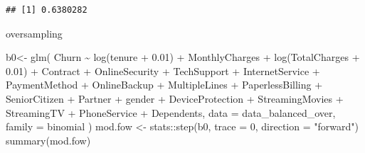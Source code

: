 \documentclass[
  twoside]{article}
\newenvironment{Shaded}{\begin{snugshade}}{\end{snugshade}}
\newcommand{\AttributeTok}[1]{\textcolor[rgb]{0.77,0.63,0.00}{#1}}
\newcommand{\DecValTok}[1]{\textcolor[rgb]{0.00,0.00,0.81}{#1}}
\newcommand{\FloatTok}[1]{\textcolor[rgb]{0.00,0.00,0.81}{#1}}
\newcommand{\FunctionTok}[1]{\textcolor[rgb]{0.00,0.00,0.00}{#1}}
\newcommand{\NormalTok}[1]{#1}
\newcommand{\OtherTok}[1]{\textcolor[rgb]{0.56,0.35,0.01}{#1}}
\newcommand{\SpecialCharTok}[1]{\textcolor[rgb]{0.00,0.00,0.00}{#1}}
\newcommand{\StringTok}[1]{\textcolor[rgb]{0.31,0.60,0.02}{#1}}
\begin{document}
\begin{verbatim}
## [1] 0.6380282
\end{verbatim}

oversampling

\begin{Shaded}
\begin{Highlighting}[]
\NormalTok{b0}\OtherTok{\textless{}{-}} \FunctionTok{glm}\NormalTok{(}
\NormalTok{  Churn }\SpecialCharTok{\textasciitilde{}} \FunctionTok{log}\NormalTok{(tenure }\SpecialCharTok{+} \FloatTok{0.01}\NormalTok{)}
  \SpecialCharTok{+}\NormalTok{ MonthlyCharges}
  \SpecialCharTok{+} \FunctionTok{log}\NormalTok{(TotalCharges }\SpecialCharTok{+} \FloatTok{0.01}\NormalTok{)}
  \SpecialCharTok{+}\NormalTok{ Contract }\SpecialCharTok{+}\NormalTok{ OnlineSecurity }\SpecialCharTok{+}\NormalTok{ TechSupport }\SpecialCharTok{+}\NormalTok{ InternetService }\SpecialCharTok{+}\NormalTok{ PaymentMethod }
  \SpecialCharTok{+}\NormalTok{ OnlineBackup }\SpecialCharTok{+}\NormalTok{ MultipleLines }\SpecialCharTok{+}\NormalTok{ PaperlessBilling }\SpecialCharTok{+}\NormalTok{ SeniorCitizen }\SpecialCharTok{+}\NormalTok{ Partner }
  \SpecialCharTok{+}\NormalTok{ gender }\SpecialCharTok{+}\NormalTok{ DeviceProtection }\SpecialCharTok{+}\NormalTok{ StreamingMovies }\SpecialCharTok{+}\NormalTok{ StreamingTV }\SpecialCharTok{+}\NormalTok{ PhoneService }
  \SpecialCharTok{+}\NormalTok{ Dependents,}
  \AttributeTok{data =}\NormalTok{ data\_balanced\_over,}
  \AttributeTok{family =}\NormalTok{ binomial}
\NormalTok{)}
\NormalTok{mod.fow }\OtherTok{\textless{}{-}}\NormalTok{ stats}\SpecialCharTok{::}\FunctionTok{step}\NormalTok{(b0, }\AttributeTok{trace =} \DecValTok{0}\NormalTok{, }\AttributeTok{direction =} \StringTok{"forward"}\NormalTok{)}
\FunctionTok{summary}\NormalTok{(mod.fow)}
\end{Highlighting}
\end{Shaded}
\end{document}
